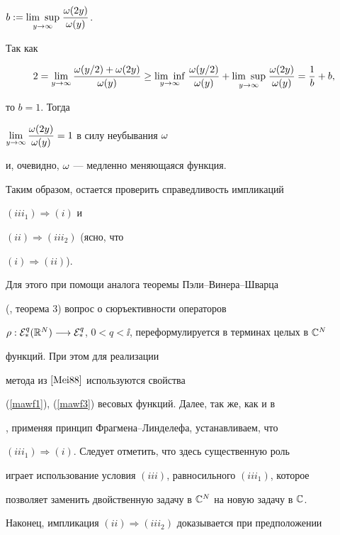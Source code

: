 $b:=\underset{y\to\ii}{\lim\ \sup}{}\;\dfrac{\o(2y)}{\o(y)}$.


Так как 


$$


2=\lim_{y\to \ii}\frac{\o(y/2)+\o(2y)}{\o(y)}\ge


\underset{y\to \ii}{\lim\ \inf}{}\;\frac{\o(


y/2)}{\o(y)}+\underset{y\to \ii}{\lim\ \sup}{}\;


\frac{\o(2y)}{\o(y)}=\frac{1}{b}+b,


$$


то $b=1$. Тогда 


$\lim\limits_{y\to\infty}\dfrac{\omega(2y)}{\omega(y)}=1$ в силу неубывания $\omega$ 


и, очевидно, $\omega$ --- медленно меняющаяся функция.





Таким образом, остается проверить справедливость импликаций 


$(iii_1)\Rightarrow (i)$ и


$(ii)\Rightarrow (iii_2)$ (ясно, что 


$(i)\Rightarrow (ii)$). 


Для этого при помощи аналога теоремы Пэли--Винера--Шварца 


(\cite{AbaTish}, теорема 3) вопрос о сюръективности операторов 


$\rho:{\cal E}_{*}^q(\rn)\longrightarrow


{\cal E}_{*}^q$, $0<q<\ii$, переформулируется в терминах целых в $\cc^N$ 


функций. При этом для реализации 


метода из $\cite{Mei88}$ используются свойства 


(\ref{mawf1}), (\ref{mawf3}) весовых функций. Далее, так же, как и в 


\cite{Mei88}, применяя принцип Фрагмена--Линделефа, устанавливаем, что 


$(iii_1)\Rightarrow (i)$. Следует отметить, что здесь существенную роль 


играет использование условия $(iii)$, равносильного $(iii_1)$, которое 


позволяет заменить двойственную задачу в $\Bbb C^N$ на новую задачу в $\Bbb C$.





Наконец, импликация $(ii)\Rightarrow (iii_2)$ доказывается при предположении 


